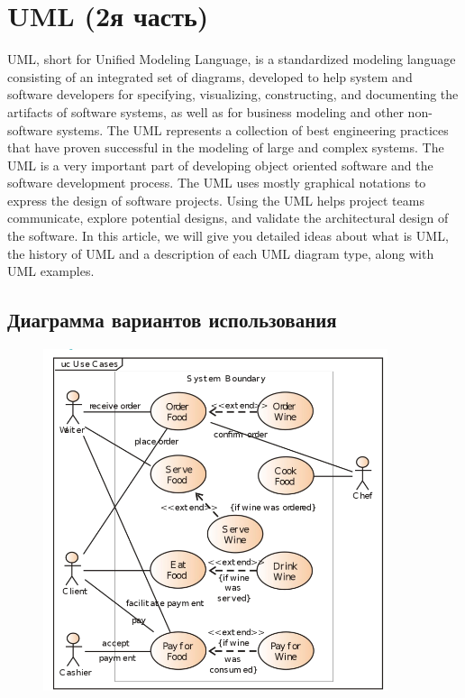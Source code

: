 \documentclass[12pt; a4paper]{book}
\theoremstyle{plain} %
\theoremstyle{defenition}
\theoremstyle{remark}
\begin{document}
\section{UML  (2я часть)}
UML, short for Unified Modeling Language, is a standardized modeling language consisting of an integrated set of diagrams, developed to help system and software developers for specifying, visualizing, constructing, and documenting the artifacts of software systems, as well as for business modeling and other non-software systems. The UML represents a collection of best engineering practices that have proven successful in the modeling of large and complex systems. The UML is a very important part of developing object oriented software and the software development process. The UML uses mostly graphical notations to express the design of software projects. Using the UML helps project teams communicate, explore potential designs, and validate the architectural design of the software. In this article, we will give you detailed ideas about what is UML, the history of UML and a description of each UML diagram type, along with UML examples.\\
\newpage
\subsection{Диаграмма вариантов использования}
\begin{figure}[!hbp]
\includegraphics[angle=0, width=0.9\textwidth]{IMG/1} 
\end{figure}
\newpage
\end{document}
